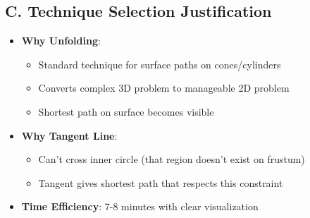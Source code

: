 \documentclass[12pt]{article}
\begin{document}
\begin{techniquesbox}
\subsection*{C. Technique Selection Justification}
\begin{itemize}[leftmargin=*]
    \item \textbf{Why Unfolding}: 
    \begin{itemize}
        \item Standard technique for surface paths on cones/cylinders
        \item Converts complex 3D problem to manageable 2D problem
        \item Shortest path on surface becomes visible
    \end{itemize}
    \item \textbf{Why Tangent Line}: 
    \begin{itemize}
        \item Can't cross inner circle (that region doesn't exist on frustum)
        \item Tangent gives shortest path that respects this constraint
    \end{itemize}
    \item \textbf{Time Efficiency}: 7-8 minutes with clear visualization
\end{itemize}
\end{techniquesbox}
\end{document}

